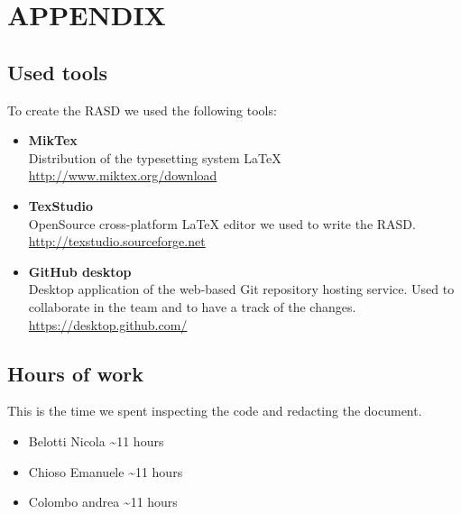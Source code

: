 \section{APPENDIX}

\subsection{Used tools}
To create the RASD we used the following tools:
\begin{itemize}
	\item \textbf{MikTex} \\ Distribution of the typesetting system LaTeX \\ \url{http://www.miktex.org/download } 
	\item \textbf{TexStudio}\\ OpenSource cross-platform LaTeX editor we used to write the RASD. \\ \url{http://texstudio.sourceforge.net  } 
	\item \textbf{GitHub desktop}\\ Desktop application of the web-based Git repository hosting service. Used to collaborate in the team and to have a track of the changes.  \\ \url{https://desktop.github.com/ } 
\end{itemize}

\subsection{Hours of work}
This is the time we spent inspecting the code and redacting the document.
\begin{itemize}
	\item {Belotti Nicola} \textasciitilde 11 hours
	\item {Chioso Emanuele} \textasciitilde 11 hours
	\item {Colombo andrea} \textasciitilde 11 hours
\end{itemize}